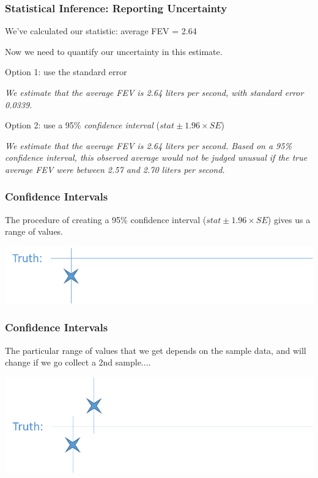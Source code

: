\documentclass[12pt, 
hyperref={colorlinks=true, linkcolor=blue, urlcolor=cyan}]{beamer}
\begin{document}
\begin{frame}
\frametitle{Statistical Inference: Reporting Uncertainty}

We've calculated our statistic: average FEV = 2.64

Now we need to quantify our uncertainty in this estimate. 

\color{blue}Option 1: \color{black} use the standard error \vspace{-0.2cm} 

\textit{We estimate that the average FEV is 2.64 liters per second, with standard error 0.0339.} \pause


\color{blue}Option 2: \color{black} use a 95\% \textit{confidence interval} ($stat \pm 1.96 \times SE$) \vspace{-0.2cm} 

\textit{We estimate that the average FEV is 2.64 liters per second. Based on a 95\% confidence interval, this observed average would not be judged unusual if the true average FEV were between 2.57 and 2.70 liters per second.} %

\end{frame}

\begin{frame}
\frametitle{Confidence Intervals}

The procedure of creating a 95\% confidence interval ($stat \pm 1.96 \times SE$) gives us a range of values.

\includegraphics[width=\textwidth]{./ci_1} 

\end{frame}

\begin{frame}[noframenumbering]
\frametitle{Confidence Intervals}

The particular range of values that we get depends on the sample data, and will change if we go collect a 2nd sample.... 

\includegraphics[width=\textwidth]{./ci_2} 
\end{frame}
\end{document}
